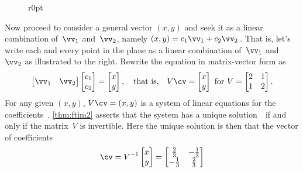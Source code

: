 \begin{example}
\begin{solution}
\begin{figure}r{0pt}
\end{figure}
Now proceed to consider a general vector \((x,y)\) and seek it as a linear combination of~\(\vv_1\) and~\(\vv_2\), namely \((x,y)=c_1\vv_1+c_2\vv_2\)\,.
That is, let's write each and every point in the plane as a linear combination of~\(\vv_1\) and~\(\vv_2\) as illustrated to the right.
Rewrite the equation in matrix-vector form as
\begin{equation*}
\begin{bmatrix} \vv_1&\vv_2 \end{bmatrix}
\begin{bmatrix} c_1\\c_2 \end{bmatrix}
=\begin{bmatrix} x\\y \end{bmatrix}
,\quad\text{that is,}\quad
V\cv=\begin{bmatrix} x\\y \end{bmatrix}
\text{ for }V=\begin{bmatrix} 2&1\\1&2 \end{bmatrix}.
\end{equation*}
For any given \((x,y)\), \(V\cv=(x,y)\) is a system of linear equations for the coefficients~\cv.
\cref{thm:ftim2} asserts that the system has a unique solution~\cv\ if and only if the matrix~\(V\) is invertible.
Here the unique solution is then that the vector of coefficients
\begin{equation*}
\cv=V^{-1}\begin{bmatrix} x\\y \end{bmatrix}
=\begin{bmatrix} \frac23&-\frac13\\-\frac13&\frac23 \end{bmatrix}

\end{equation*}
\end{solution}
\end{example}
